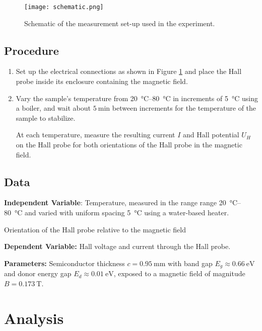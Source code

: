\documentclass[11pt, a4paper]{article}
\begin{document}
\begin{figure}
	\centering
	\texttt{[image: schematic.png]}
	\caption{Schematic of the measurement set-up used in the experiment.}
	\label{halpoj:fig:schematic}
\end{figure}


\subsection{Procedure}
\begin{enumerate}
	\item Set up the electrical connections as shown in Figure \ref{halpoj:fig:schematic} and place the Hall probe inside its enclosure containing the magnetic field.
	
	\item  Vary the sample's temperature from  \SIrange{20}{80}{\degreeCelsius} in increments of \SI{5}{\degreeCelsius} using a boiler, and wait about $ \SI{5}{\minute} $ between increments for the temperature of the sample to stabilize. 
	
	At each temperature, measure the resulting current $ I $ and Hall potential $ U_{H} $ on the Hall probe for both orientations of the Hall probe in the magnetic field.
	
\end{enumerate}

\subsection{Data}
\textbf{Independent Variable}: Temperature, measured in the range range \SIrange{20}{80}{\degreeCelsius} and varied with uniform spacing \SI{5}{\degreeCelsius} using a water-based heater.

Orientation of the Hall probe relative to the magnetic field

\vspace{2mm}
\textbf{Dependent Variable:} Hall voltage and current through the Hall probe.

\vspace{2mm}
\textbf{Parameters:} Semiconductor thickness $ c = \SI{0.95}{\milli \meter} $ with band gap $ E_{g} \approx \SI{0.66}{\electronvolt} $ and donor energy gap $ E_{d} \approx \SI{0.01}{\electronvolt} $, exposed to a magnetic field of magnitude $ B = \SI{0.173}{\tesla} $.



\section{Analysis}
\end{document}
